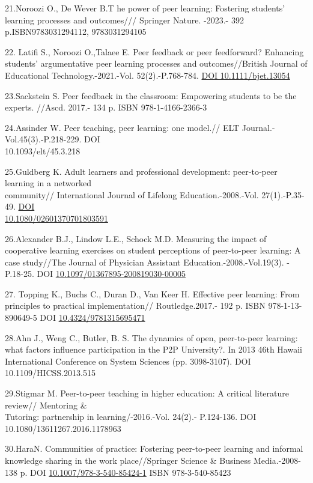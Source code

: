 \begin{references}
21.Noroozi O., De Wever B.T he power of peer learning: Fostering
students' learning processes and outcomes/// Springer Nature. -2023.-
392 p.ISBN9783031294112, 9783031294105

22. Latifi S., Noroozi O.,Talaee E. Peer feedback or peer feedforward?
Enhancing students' argumentative peer learning processes and
outcomes//British Journal of Educational Technology.-2021.-Vol.
52(2).-P.768-784. \href{https://doi.org/10.1111/bjet.13054}{DOI
10.1111/bjet.13054}

23.Sackstein S. Peer feedback in the classroom: Empowering students to
be the experts. //Ascd. 2017.- 134 p. ISBN 978-1-4166-2366-3

24.Assinder W. Peer teaching, peer learning: one model.// ELT
Journal.-Vol.45(3).-P.218-229. DOI \\10.1093/elt/45.3.218

25.Guldberg K. Adult learners and professional development: peer‐to‐peer
learning in a networked \\community// International Journal of Lifelong
Education.-2008.-Vol. 27(1).-P.35-49.
\href{https://doi.org/10.1080/02601370701803591}{DOI\\
10.1080/02601370701803591}

26.Alexander B.J., Lindow L.E., Schock M.D. Measuring the impact of
cooperative learning exercises on student perceptions of peer-to-peer
learning: A case study//The Journal of Physician Assistant
Education.-2008.-Vol.19(3). - P.18-25. DOI
\href{http://dx.doi.org/10.1097/01367895-200819030-00005}{10.1097/01367895-200819030-00005}

27. Topping K., Buchs C., Duran D., Van Keer H. Effective peer learning:
From principles to practical implementation// Routledge.2017.- 192 p.
ISBN 978-1-13-890649-5
DOI \href{http://dx.doi.org/10.4324/9781315695471}{10.4324/9781315695471}

28.Ahn J., Weng C., Butler, B. S. The dynamics of open, peer-to-peer
learning: what factors influence participation in the P2P University?.
In 2013 46th Hawaii International Conference on System Sciences (pp.
3098-3107). DOI 10.1109/HICSS.2013.515

29.Stigmar M. Peer-to-peer teaching in higher education: A critical
literature review// Mentoring \& \\Tutoring: partnership in
learning/-2016.-Vol. 24(2).- P.124-136.
DOI 10.1080/13611267.2016.1178963

30.HaraN. Communities of practice: Fostering peer-to-peer learning and
informal knowledge sharing in the work place//Springer Science \&
Business Media.-2008-138 p.
DOI \href{http://dx.doi.org/10.1007/978-3-540-85424-1}{10.1007/978-3-540-85424-1}
ISBN 978-3-540-85423


\end{references}
